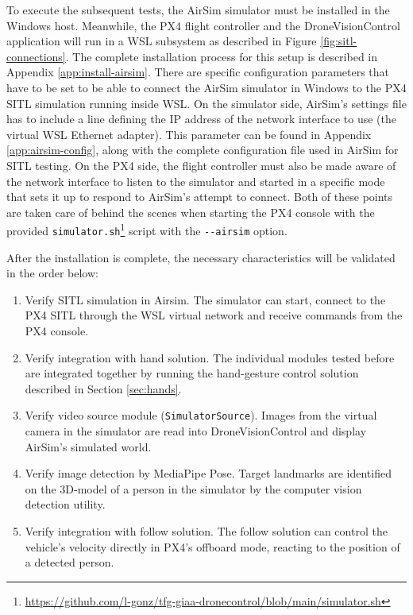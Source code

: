 To execute the subsequent tests, the AirSim simulator must be installed in the Windows host. Meanwhile, the PX4 flight controller and the DroneVisionControl application will run in a WSL subsystem as described in Figure \ref{fig:sitl-connections}. The complete installation process for this setup is described in Appendix \ref{app:install-airsim}.
There are specific configuration parameters that have to be set to be able to connect the AirSim simulator in Windows to the PX4 SITL simulation running inside WSL. On the simulator side, AirSim's settings file has to include a line defining the IP address of the network interface to use (the virtual WSL Ethernet adapter). This parameter can be found in Appendix \ref{app:airsim-config}, along with the complete configuration file used in AirSim for SITL testing. On the PX4 side, the flight controller must also be made aware of the network interface to listen to the simulator and started in a specific mode that sets it up to respond to AirSim's attempt to connect. Both of these points are taken care of behind the scenes when starting the PX4 console with the provided \texttt{simulator.sh}\footnote{\url{https://github.com/l-gonz/tfg-giaa-dronecontrol/blob/main/simulator.sh}} script with the \texttt{-{}-airsim} option.


After the installation is complete, the necessary characteristics will be validated in the order below:
\begin{enumerate}
    \item Verify SITL simulation in Airsim. The simulator can start, connect to the PX4 SITL through the WSL virtual network and receive commands from the PX4 console.
    \item Verify integration with hand solution. The individual modules tested before are integrated together by running the hand-gesture control solution described in Section \ref{sec:hands}.
    \item Verify video source module (\texttt{SimulatorSource}). Images from the virtual camera in the simulator are read into DroneVisionControl and display AirSim's simulated world.
    \item Verify image detection by MediaPipe Pose. Target landmarks are identified on the 3D-model of a person in the simulator by the computer vision detection utility.
    \item Verify integration with follow solution. The follow solution can control the vehicle's velocity directly in PX4's offboard mode, reacting to the position of a detected person.
\end{enumerate}


